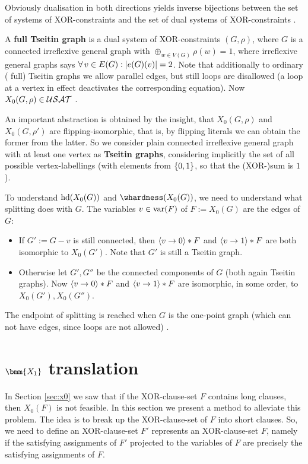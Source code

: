 \documentclass[]{book}
\begin{document}
Obviously dualisation in both directions yields inverse bijections between the set of systems of XOR-constraints and the set of dual systems of XOR-constraints \cite{h5}.

\begin{defi}\label{def:tgraph}
\cite{h5} A \textbf{full Tseitin graph} is a dual system of XOR-constraints $(G,\rho)$, where $G$ is a connected irreflexive general graph with 
$\oplus_{w \in V(G)} \rho(w) = 1$, where irreflexive general graphs says $\forall\, v \in E(G) : \lvert e(G)(v) \rvert = 2$. Note that additionally to ordinary (
full) Tseitin graphs we allow parallel edges, but still loops are disallowed (a loop at a vertex in effect deactivates the corresponding equation). 
Now $X_0(G,\rho) \in \mathcal{USAT}$ .
\end{defi}

An important abstraction is obtained by the insight, that $X_0(G,\rho)$ and $X_0(G,\rho')$ are flipping-isomorphic, that is, by flipping literals we 
can obtain the former from the latter. So we consider plain connected irreflexive general graph with at least one vertex as \textbf{Tseitin graphs}, 
considering implicitly the set of all possible vertex-labellings (with elements from $\{ 0,1 \}$, so that the (XOR-)sum is $1$).

To understand $\operatorname{hd}(X_0(G))$ and $\whardness(X_0(G))$, we need to understand what splitting does with $G$. 
The variables $v \in \operatorname{var}(F)$ of $F := X_0(G)$ are the edges of $G$:
\begin{itemize}
\item If $G' := G - v$ is still connected, then $\langle v \rightarrow 0 \rangle * F$ and $\langle v \rightarrow 1 \rangle * F$ are both isomorphic to $X_0(G')$. Note that $G'$ is still a Tseitin graph.
\item Otherwise let $G', G''$ be the connected components of $G$ (both again Tseitin graphs). Now $\langle v \rightarrow 0 \rangle * F$ and $\langle v \rightarrow 1 \rangle * F$ are isomorphic, in some 
order, to $X_0(G'), X_0(G'')$.
\end{itemize}
The endpoint of splitting is reached when $G$ is the one-point graph (which can not have edges, since loops are not allowed) \cite{h5}. 

\section{$\bmm{X_1}$ translation}
\label{sec:x1}

In Section \ref{sec:x0} we saw that if the XOR-clause-set $F$ contains long clauses, then $X_0(F)$ is not feasible.
In this section we present a method to alleviate this problem. The idea is to break up the XOR-clause-set of $F$ into short clauses. 
So, we need to define an XOR-clause-set $F'$ represents an XOR-clause-set $F$, namely if the satisfying assignments of $F'$ projected to 
the variables of $F$ are precisely the satisfying assignments of $F$.
\end{document}
